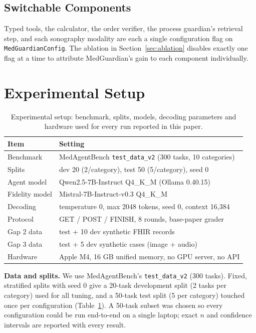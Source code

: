 \documentclass[conference]{IEEEtran}
\begin{document}
\subsection{Switchable Components}
Typed tools, the calculator, the order verifier, the process guardian's retrieval step, and each sonography modality are each a single configuration flag on \texttt{MedGuardianConfig}. The ablation in Section~\ref{sec:ablation} disables exactly one flag at a time to attribute MedGuardian's gain to each component individually.

\section{Experimental Setup}\label{sec:setup}

\begin{table}[t]
\centering
\small
\caption{Experimental setup: benchmark, splits, models, decoding parameters and hardware used for every run reported in this paper.}
\label{tab:setup}
\begin{tabular}{@{}l>{\raggedright\arraybackslash}p{5.1cm}@{}}
\toprule
\textbf{Item} & \textbf{Setting} \\
\midrule
Benchmark & MedAgentBench \texttt{test\_data\_v2} (300 tasks, 10 categories) \\
Splits & dev 20 (2/category), test 50 (5/category), seed 0 \\
Agent model & Qwen2.5-7B-Instruct Q4\_K\_M (Ollama 0.40.15) \\
Fidelity model & Mistral-7B-Instruct-v0.3 Q4\_K\_M \\
Decoding & temperature 0, max 2048 tokens, seed 0, context 16,384 \\
Protocol & GET / POST / FINISH, 8 rounds, base-paper grader \\
Gap 2 data & 30 test + 10 dev synthetic FHIR records \\
Gap 3 data & 20 test + 5 dev synthetic cases (image + audio) \\
Hardware & Apple M4, 16 GB unified memory, no GPU server, no API \\
\bottomrule
\end{tabular}
\end{table}

\textbf{Data and splits.} We use MedAgentBench's \texttt{test\_data\_v2} (300 tasks). Fixed, stratified splits with seed 0 give a 20-task development split (2 tasks per category) used for all tuning, and a 50-task test split (5 per category) touched once per configuration (Table~\ref{tab:setup}). A 50-task subset was chosen so every configuration could be run end-to-end on a single laptop; exact $n$ and confidence intervals are reported with every result.
\end{document}
